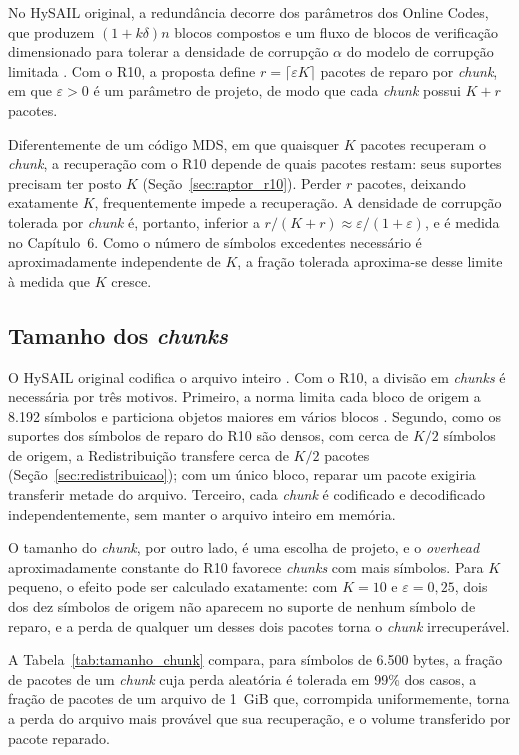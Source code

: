 No HySAIL original, a redundância decorre dos parâmetros dos Online Codes, que produzem $(1 + k\delta)n$ blocos compostos e um fluxo de blocos de verificação dimensionado para tolerar a densidade de corrupção $\alpha$ do modelo de corrupção limitada \cite{amaral2019hysail}. Com o R10, a proposta define $r = \lceil \varepsilon K \rceil$ pacotes de reparo por \emph{chunk}, em que $\varepsilon > 0$ é um parâmetro de projeto, de modo que cada \emph{chunk} possui $K + r$ pacotes.

Diferentemente de um código MDS, em que quaisquer $K$ pacotes recuperam o \emph{chunk}, a recuperação com o R10 depende de quais pacotes restam: seus suportes precisam ter posto $K$ (Seção~\ref{sec:raptor_r10}). Perder $r$ pacotes, deixando exatamente $K$, frequentemente impede a recuperação. A densidade de corrupção tolerada por \emph{chunk} é, portanto, inferior a $r / (K + r) \approx \varepsilon / (1 + \varepsilon)$, e é medida no Capítulo~6. Como o número de símbolos excedentes necessário é aproximadamente independente de $K$, a fração tolerada aproxima-se desse limite à medida que $K$ cresce.

\subsection{Tamanho dos \emph{chunks}}
\label{sec:tamanho_chunk}

O HySAIL original codifica o arquivo inteiro \cite{amaral2019hysail}. Com o R10, a divisão em \emph{chunks} é necessária por três motivos. Primeiro, a norma limita cada bloco de origem a 8.192 símbolos e particiona objetos maiores em vários blocos \cite{luby2007rfc5053}. Segundo, como os suportes dos símbolos de reparo do R10 são densos, com cerca de $K/2$ símbolos de origem, a Redistribuição transfere cerca de $K/2$ pacotes (Seção~\ref{sec:redistribuicao}); com um único bloco, reparar um pacote exigiria transferir metade do arquivo. Terceiro, cada \emph{chunk} é codificado e decodificado independentemente, sem manter o arquivo inteiro em memória.

O tamanho do \emph{chunk}, por outro lado, é uma escolha de projeto, e o \emph{overhead} aproximadamente constante do R10 favorece \emph{chunks} com mais símbolos. Para $K$ pequeno, o efeito pode ser calculado exatamente: com $K = 10$ e $\varepsilon = 0{,}25$, dois dos dez símbolos de origem não aparecem no suporte de nenhum símbolo de reparo, e a perda de qualquer um desses dois pacotes torna o \emph{chunk} irrecuperável.

A Tabela~\ref{tab:tamanho_chunk} compara, para símbolos de 6.500 bytes, a fração de pacotes de um \emph{chunk} cuja perda aleatória é tolerada em 99\% dos casos, a fração de pacotes de um arquivo de 1~GiB que, corrompida uniformemente, torna a perda do arquivo mais provável que sua recuperação, e o volume transferido por pacote reparado.

